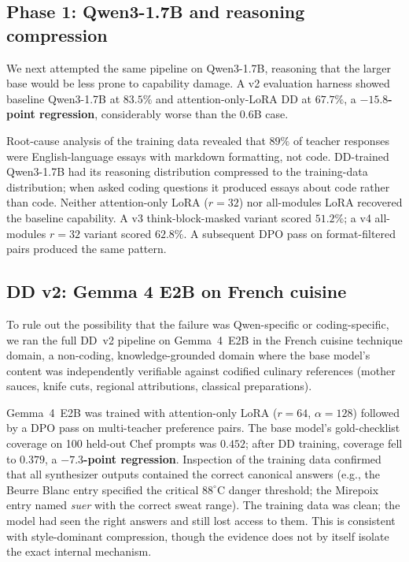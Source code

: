 \documentclass[11pt,a4paper]{article}
\begin{document}
\subsection{Phase 1: Qwen3-1.7B and reasoning compression}

We next attempted the same pipeline on Qwen3-1.7B, reasoning that the larger base would be less prone to capability damage. A v2 evaluation harness showed baseline Qwen3-1.7B at $83.5\%$ and attention-only-LoRA DD at $67.7\%$, a \textbf{$-15.8$-point regression}, considerably worse than the 0.6B case.

Root-cause analysis of the training data revealed that $89\%$ of teacher responses were English-language essays with markdown formatting, not code. DD-trained Qwen3-1.7B had its reasoning distribution compressed to the training-data distribution; when asked coding questions it produced essays about code rather than code. Neither attention-only LoRA ($r{=}32$) nor all-modules LoRA recovered the baseline capability. A v3 think-block-masked variant scored $51.2\%$; a v4 all-modules $r{=}32$ variant scored $62.8\%$. A subsequent DPO pass on format-filtered pairs produced the same pattern.

\subsection{DD v2: Gemma 4 E2B on French cuisine}

To rule out the possibility that the failure was Qwen-specific or coding-specific, we ran the full DD~v2 pipeline on Gemma~4~E2B in the French cuisine technique domain, a non-coding, knowledge-grounded domain where the base model's content was independently verifiable against codified culinary references (mother sauces, knife cuts, regional attributions, classical preparations).

Gemma~4~E2B was trained with attention-only LoRA ($r{=}64$, $\alpha{=}128$) followed by a DPO pass on multi-teacher preference pairs. The base model's gold-checklist coverage on 100 held-out Chef prompts was $0.452$; after DD training, coverage fell to $0.379$, a \textbf{$-7.3$-point regression}. Inspection of the training data confirmed that all synthesizer outputs contained the correct canonical answers (e.g., the Beurre Blanc entry specified the critical $88^{\circ}$C danger threshold; the Mirepoix entry named \emph{suer} with the correct sweat range). The training data was clean; the model had seen the right answers and still lost access to them. This is consistent with style-dominant compression, though the evidence does not by itself isolate the exact internal mechanism.
\end{document}
